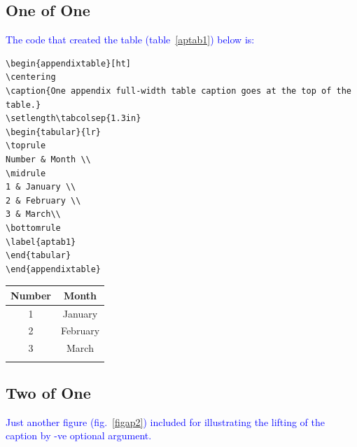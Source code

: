 \documentclass[phd,showframe]{ndsu-thesis-2022}
\newcommand\italk[1]{\textcolor{blue}{#1}}  %
\begin{document}

\subsection{One of One}
\label{sub1}
\kant[2]

\italk{The code that created the table (table~\ref{aptab1}) below is:}

{\onehalfspacing
\begin{verbatim}
\begin{appendixtable}[ht]
\centering
\caption{One appendix full-width table caption goes at the top of the table.}
\setlength\tabcolsep{1.3in}
\begin{tabular}{lr}
\toprule
Number & Month \\
\midrule
1 & January \\
2 & February \\
3 & March\\
\bottomrule
\label{aptab1}
\end{tabular}
\end{appendixtable}
\end{verbatim}
}

\begin{appendixtable}[ht]
\centering
\caption{One appendix full-width table caption goes at the top of the table.}
\setlength\tabcolsep{1.3in}
\begin{tabular}{cc}
\toprule
Number & Month \\
\midrule
1 & January \\
2 & February \\
3 & March\\
\bottomrule
\label{aptab1}
\end{tabular}
\end{appendixtable}

\subsection{Two of One}

\italk{Just another figure (fig.~\ref{figap2}) included for illustrating the lifting of the caption by -ve optional argument. }

\end{document}
